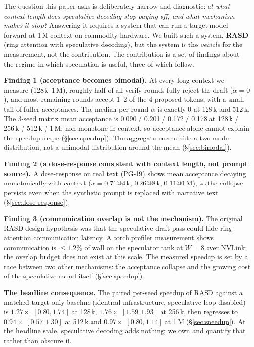 \documentclass{article}
\begin{document}
The question this paper asks is deliberately narrow and
diagnostic: \emph{at what context length does speculative decoding
stop paying off, and what mechanism makes it stop?} Answering it
requires a system that can run a target-model forward at 1\,M
context on commodity hardware. We built such a system,
\textbf{RASD} (ring attention with speculative decoding), but the
system is the \emph{vehicle} for the measurement, not the
contribution. The contribution is a set of findings about the
regime in which speculation is useful, three of which follow.

\textbf{Finding 1 (acceptance becomes bimodal).} At every long
context we measure (128\,k--1\,M), roughly half of all verify
rounds fully reject the draft ($\alpha = 0$), and most remaining
rounds accept 1--2 of the 4 proposed tokens, with a small tail of
fuller acceptances. The median per-round
$\alpha$ is exactly 0 at 128\,k and 512\,k. The 3-seed matrix
mean acceptance is 0.090 / 0.201 / 0.172 / 0.178 at
128\,k / 256\,k / 512\,k / 1\,M: non-monotone in context, so
acceptance alone cannot explain the speedup shape
(\S\ref{sec:speedup}). The aggregate means hide a two-mode
distribution, not a unimodal distribution around the mean
(\S\ref{sec:bimodal}).

\textbf{Finding 2 (a dose-response consistent with context
length, not prompt source).} A dose-response on real text (PG-19) shows mean
acceptance decaying monotonically with context
($\alpha = 0.71$@4\,k, $0.26$@8\,k, $0.11$@1\,M), so the
collapse persists even when the synthetic prompt is replaced with
narrative text (\S\ref{sec:dose-response}).

\textbf{Finding 3 (communication overlap is not the mechanism).}
The original RASD design hypothesis was that the speculative draft
pass could hide ring-attention communication latency. A
torch.profiler measurement shows communication is $\leq 1.2\%$ of
wall on the speculator rank at $W=8$ over NVLink; the overlap
budget does not exist at this scale. The measured speedup is set
by a race between two other mechanisms: the acceptance collapse
and the growing cost of the speculative round itself
(\S\ref{sec:speedup}).

\textbf{The headline consequence.} The paired per-seed speedup of
RASD against a matched target-only baseline (identical
infrastructure, speculative loop disabled) is
$1.27\times$ $[0.80, 1.74]$ at 128\,k,
$1.76\times$ $[1.59, 1.93]$ at 256\,k, then regresses to
$0.94\times$ $[0.57, 1.30]$ at 512\,k and
$0.97\times$ $[0.80, 1.14]$ at 1\,M
(\S\ref{sec:speedup}). At the headline scale, speculative decoding
adds nothing; we own and quantify that rather than obscure it.
\end{document}
